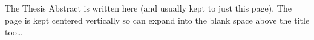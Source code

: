 \documentclass[11pt, titlepage, a4paper, oneside, onecolumn]{scrbook} %
\begin{document}
\clearpage
\setcounter{page}{1}






\clearpage







\pagestyle{plain} %




The Thesis Abstract is written here (and usually kept to just this page). The page is kept centered vertically so can expand into the blank space above the title too\ldots

\clearpage %



\pagestyle{plain} %





%
%
%

\printnomenclature[1.5in]
\end{document}
